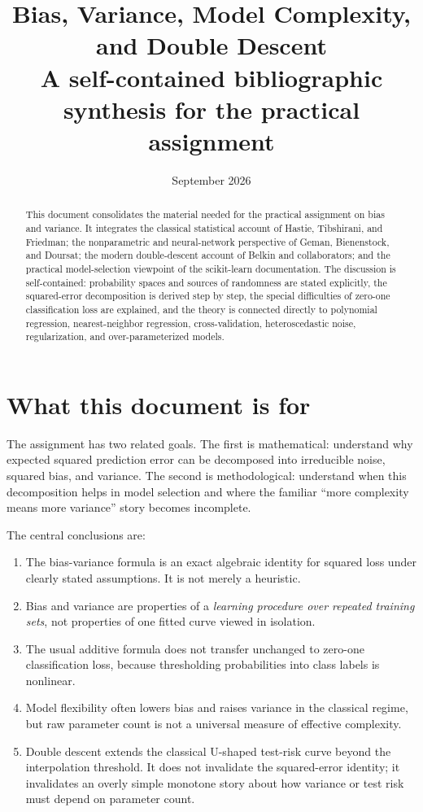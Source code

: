\documentclass[11pt,a4paper]{article}
\title{\textbf{Bias, Variance, Model Complexity, and Double Descent}\\
\large A self-contained bibliographic synthesis for the practical assignment}
\author{}
\date{September 2026}
\begin{document}
\maketitle

\begin{abstract}
This document consolidates the material needed for the practical assignment on bias and variance. It integrates the classical statistical account of Hastie, Tibshirani, and Friedman; the nonparametric and neural-network perspective of Geman, Bienenstock, and Doursat; the modern double-descent account of Belkin and collaborators; and the practical model-selection viewpoint of the scikit-learn documentation. The discussion is self-contained: probability spaces and sources of randomness are stated explicitly, the squared-error decomposition is derived step by step, the special difficulties of zero-one classification loss are explained, and the theory is connected directly to polynomial regression, nearest-neighbor regression, cross-validation, heteroscedastic noise, regularization, and over-parameterized models.
\end{abstract}

\tableofcontents

\section{What this document is for}

The assignment has two related goals. The first is mathematical: understand why expected squared prediction error can be decomposed into irreducible noise, squared bias, and variance. The second is methodological: understand when this decomposition helps in model selection and where the familiar ``more complexity means more variance'' story becomes incomplete.

The central conclusions are:
\begin{enumerate}
  \item The bias-variance formula is an exact algebraic identity for squared loss under clearly stated assumptions. It is not merely a heuristic.
  \item Bias and variance are properties of a \emph{learning procedure over repeated training sets}, not properties of one fitted curve viewed in isolation.
  \item The usual additive formula does not transfer unchanged to zero-one classification loss, because thresholding probabilities into class labels is nonlinear.
  \item Model flexibility often lowers bias and raises variance in the classical regime, but raw parameter count is not a universal measure of effective complexity.
  \item Double descent extends the classical U-shaped test-risk curve beyond the interpolation threshold. It does not invalidate the squared-error identity; it invalidates an overly simple monotone story about how variance or test risk must depend on parameter count.
\end{enumerate}
\end{document}
